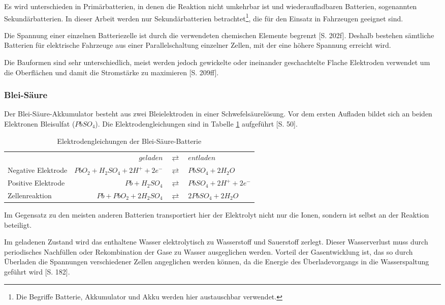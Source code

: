 Es wird unterschieden in Primärbatterien, in denen die Reaktion nicht umkehrbar ist und wiederaufladbaren Batterien, sogenannten Sekundärbatterien. In dieser Arbeit werden nur Sekundärbatterien betrachtet\footnote{Die Begriffe Batterie, Akkumulator und Akku werden hier austauschbar verwendet.}, die für den Einsatz in Fahrzeugen geeignet sind.

Die Spannung einer einzelnen Batteriezelle ist durch die verwendeten chemischen Elemente begrenzt \cite{Sterner:2014}[S. 202f]. Deshalb bestehen sämtliche Batterien für elektrische Fahrzeuge aus einer Parallelschaltung einzelner Zellen, mit der eine höhere Spannung erreicht wird.

Die Bauformen sind sehr unterschiedlich, meist werden jedoch gewickelte oder ineinander geschachtelte Flache Elektroden verwendet um die Oberflächen und damit die Stromstärke zu maximieren \cite{Sterner:2014}[S. 209ff].

\subsubsection{Blei-Säure}
Der Blei-Säure-Akkumulator besteht aus zwei Bleielektroden in einer Schwefelsäurelösung. Vor dem ersten Aufladen bildet sich an beiden Elektronen Bleisulfat ($PbSO_4$). Die Elektrodengleichungen sind in Tabelle \ref{Pb} aufgeführt \cite{KiehneBattery}[S. 50].

\begin{table}\centering
	\begin{tabularx}{\linewidth}{XrcX}
		&                       $geladen$ & $\rightleftarrows$ & $entladen$             \\
		Negative Elektrode & $PbO_2 + H_2SO_4 + 2H^+ + 2e^-$ & $\rightleftarrows$ & $PbSO_4 + 2H_2O$       \\
		Positive Elektrode &                  $Pb + H_2SO_4$ & $\rightleftarrows$ & $PbSO_4 + 2H^+ + 2e^-$ \\ \midrule
		Zellenreaktion     &         $Pb + PbO_2 + 2H_2SO_4$ & $\rightleftarrows$ & $2PbSO_4 + 2H_2O$      \\
	\end{tabularx}
	\caption{Elektrodengleichungen der Blei-Säure-Batterie}
	\label{Pb}
\end{table}

Im Gegensatz zu den meisten anderen Batterien transportiert hier der Elektrolyt nicht nur die Ionen, sondern ist selbst an der Reaktion beteiligt.

Im geladenen Zustand wird das enthaltene Wasser elektrolytisch zu Wasserstoff und Sauerstoff zerlegt. Dieser Wasserverlust muss durch periodisches Nachfüllen oder Rekombination der Gase zu Wasser ausgeglichen werden. Vorteil der Gasentwicklung ist, das so durch Überladen die Spannungen verschiedener Zellen angeglichen werden können, da die Energie des Überladevorgangs in die Wasserspaltung geführt wird \cite{tub_aleph001746639}[S. 182].


